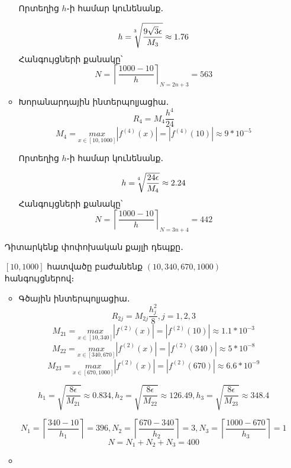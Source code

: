 \documentclass{article}
\begin{document}
\begin{enumerate}
\begin{itemize}
Որտեղից $h$֊ի համար կունենանք․

				$$ h = \sqrt[\leftroot{5} \uproot{5} 3]{\dfrac{9 \sqrt{3} \epsilon}{M_{3}}} \approx 1.76$$
				Հանգույցների քանակը՝ $$N = \left \lceil{\dfrac{1000 - 10}{h}} \right \rceil_{N = 2n + 3} = 563$$
\item
Խորանարդային ինտերպոլյացիա․
				$$R_{4} = M_{4} \dfrac{h^{4}}{24}$$
				$$M_{4} = \underset{x \in \left[10, 1000\right]}{max}\left|f^{\left(4\right)}\left(x\right)\right| = \left|f^{\left(4\right)}\left(10\right)\right| \approx 9 * 10^{-5}$$

Որտեղից $h$֊ի համար կունենանք․

				$$ h = \sqrt[\leftroot{5} \uproot{5} 4]{\dfrac{24 \epsilon}{M_{4}}} \approx 2.24$$
				Հանգույցների քանակը՝ $$N = \left \lceil{\dfrac{1000 - 10}{h}} \right \rceil_{N = 3n + 4} = 442$$

\end{itemize}


Դիտարկենք փոփոխական քայլի դեպքը․

$\left[10, 1000\right]$ հատվածը բաժանենք $\left(10, 340, 670, 1000\right)$ հանգույցներով։


\begin{itemize}

\item

Գծային ինտերպոլյացիա․
				$$R_{2j} = M_{2j} \dfrac{h_{j}^{2}}{8}, j = 1, 2, 3$$
				$$M_{21} = \underset{x \in \left[10, 340\right]}{max}\left|f^{\left(2\right)}\left(x\right)\right| = \left|f^{\left(2\right)}\left(10\right)\right| \approx 1.1 * 10^{-3}$$
				$$M_{22} = \underset{x \in \left[340, 670\right]}{max}\left|f^{\left(2\right)}\left(x\right)\right| = \left|f^{\left(2\right)}\left(340\right)\right| \approx 5 * 10^{-8}$$
				$$M_{23} = \underset{x \in \left[670, 1000\right]}{max}\left|f^{\left(2\right)}\left(x\right)\right| = \left|f^{\left(2\right)}\left(670\right)\right| \approx 6.6 * 10^{-9}$$


				$$ h_{1} = \sqrt{\dfrac{8 \epsilon}{M_{21}}} \approx 0.834, h_{2} = \sqrt{\dfrac{8 \epsilon}{M_{22}}} \approx 126.49, h_{3} = \sqrt{\dfrac{8 \epsilon}{M_{23}}} \approx 348.4$$

				$$N_{1} = \left \lceil{\dfrac{340 - 10}{h_{1}}} \right \rceil = 396, N_{2} = \left \lceil{\dfrac{670 - 340}{h_{2}}} \right \rceil = 3, N_{3} = \left \lceil{\dfrac{1000 - 670}{h_{3}}} \right \rceil = 1$$
				$$ N = N_{1} + N_{2} + N_{3} = 400$$

\item


\end{itemize}
\end{enumerate}
\end{document}
